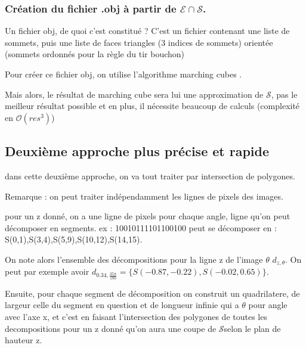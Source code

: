 \documentclass{article}
\begin{document}
\subsubsection*{Création du fichier .obj à partir de $\mathcal{E}\cap\mathcal{S}$.}

Un fichier obj, de quoi c'est constitué ? C'est un fichier contenant
une liste de sommets, puis une liste de faces triangles (3 indices
de sommets) orientée (sommets ordonnés pour la règle du tir bouchon)

Pour créer ce fichier obj, on utilise l'algorithme marching cubes
.\cite{key-1}

Mais alors, le résultat de marching cube sera lui une approximation de $\mathcal{S}$,
pas le meilleur résultat possible et en plus, il nécessite beaucoup
de calculs (complexité en $\mathcal{O}(res^{3})$)

\subsection*{Deuxième approche plus précise et rapide}

dans cette deuxième approche, on va tout traiter par intersection
de polygones.

Remarque : on peut traiter indépendamment les lignes de pixels des
images.

pour un z donné, on a une ligne de pixels pour chaque angle, ligne
qu'on peut décomposer en segments. ex : 10010111101100100 peut se
décomposer en : S(0,1),S(3,4),S(5,9),S(10,12),S(14,15).

On note alors l'ensemble des décompositions pour la ligne z de l'image
$\theta$ $d_{z,\theta}$. On peut par exemple avoir $d_{0.34,\frac{35\pi}{180}}=\{S(-0.87,-0.22),S(-0.02,0.65)\}$.

Ensuite, pour chaque segment de décomposition on construit un quadrilatere,
de largeur celle du segment en question et de longueur infinie qui
a $\theta$ pour angle avec l'axe x, et c'est en faisant l'intersection
des polygones de toutes les decompositions pour un z donné qu'on aura
une coupe de $\mathcal{S}$selon le plan de hauteur z.
\end{document}
